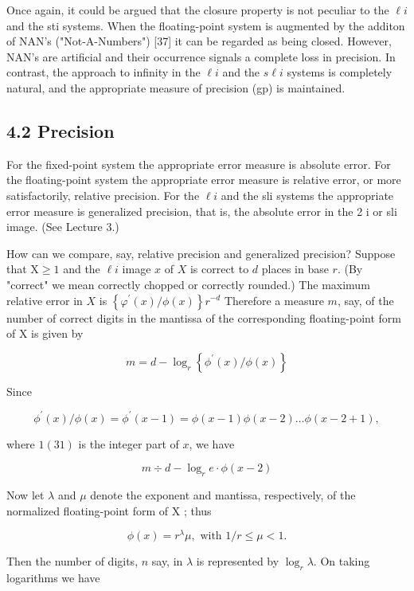 \documentclass[10pt]{article}
\begin{document}
Once again, it could be argued that the closure property is not peculiar to the $\ell i$ and the sti systems. When the floating-point system is augmented by the additon of NAN's ("Not-A-Numbers") [37] it can be regarded as being closed. However, NAN's are artificial and their occurrence signals a complete loss in precision. In contrast, the approach to infinity in the $\ell i$ and the $s \ell i$ systems is completely natural, and the appropriate measure of precision (gp) is maintained.

\subsection*{4.2 Precision}
For the fixed-point system the appropriate error measure is absolute error. For the floating-point system the appropriate error measure is relative error, or more satisfactorily, relative precision. For the $\ell i$ and the sli systems the appropriate error measure is generalized precision, that is, the absolute error in the 2 i or sli image. (See Lecture 3.)

How can we compare, say, relative precision and generalized precision? Suppose that $\mathrm{X} \geqslant 1$ and the $\ell i$ image $x$ of $X$ is correct to $d$ places in base $r$. (By "correct" we mean correctly chopped or correctly rounded.) The maximum relative error in $X$ is $\left\{\varphi^{\prime}(x) / \phi(x)\right\} r^{-d}$ Therefore a measure $m$, say, of the number of correct digits in the mantissa of the corresponding floating-point form of X is given by

$$
m=d-\log _{r}\left\{\phi^{\prime}(x) / \phi(x)\right\}
$$

Since

$$
\phi^{\prime}(x) / \phi(x)=\phi^{\prime}(x-1)=\phi(x-1) \phi(x-2) \ldots \phi(x-2+1),
$$

where $1(31)$ is the integer part of $x$, we have


\begin{equation*}
m \div d-\log _{r} e \cdot \phi(x-2) \tag{4.2.1}
\end{equation*}


Now let $\lambda$ and $\mu$ denote the exponent and mantissa, respectively, of the normalized floating-point form of X ; thus

$$
\phi(x)=r^{\lambda} \mu, \text { with } 1 / r \leqslant \mu<1 .
$$

Then the number of digits, $n$ say, in $\lambda$ is represented by $\log _{r} \lambda$. On taking logarithms we have
\end{document}
